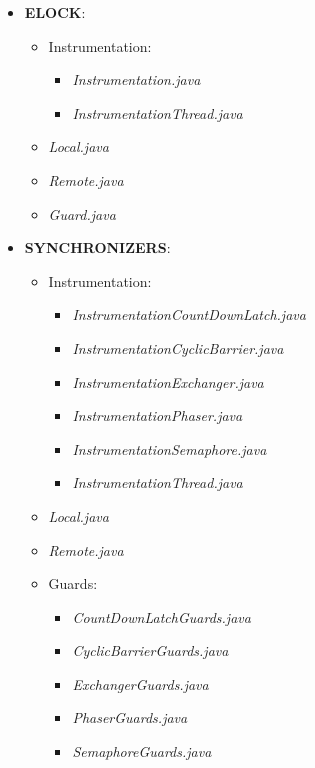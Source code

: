 \documentclass[]{usiinfthesis}
\begin{document}
\begin{itemize}
\begin{itemize}
    \end{itemize}
    \item \textbf{ELOCK}:
    \begin{itemize}
        \item Instrumentation:
        \begin{itemize}
            \item \textit{Instrumentation.java}
            \item \textit{InstrumentationThread.java}
        \end{itemize}
        \item \textit{Local.java}
        \item \textit{Remote.java}
        \item \textit{Guard.java}
    \end{itemize}
    \item \textbf{SYNCHRONIZERS}:
    \begin{itemize}
        \item Instrumentation:
        \begin{itemize}
            \item \textit{InstrumentationCountDownLatch.java}
            \item \textit{InstrumentationCyclicBarrier.java}
            \item \textit{InstrumentationExchanger.java}
            \item \textit{InstrumentationPhaser.java}
            \item \textit{InstrumentationSemaphore.java}
            \item \textit{InstrumentationThread.java}
        \end{itemize}
        \item \textit{Local.java}
        \item \textit{Remote.java}
        \item Guards:
        \begin{itemize}
            \item \textit{CountDownLatchGuards.java}
            \item \textit{CyclicBarrierGuards.java}
            \item \textit{ExchangerGuards.java}
            \item \textit{PhaserGuards.java}
            \item \textit{SemaphoreGuards.java}
        \end{itemize}
    \end{itemize}

\end{itemize}
\end{document}
